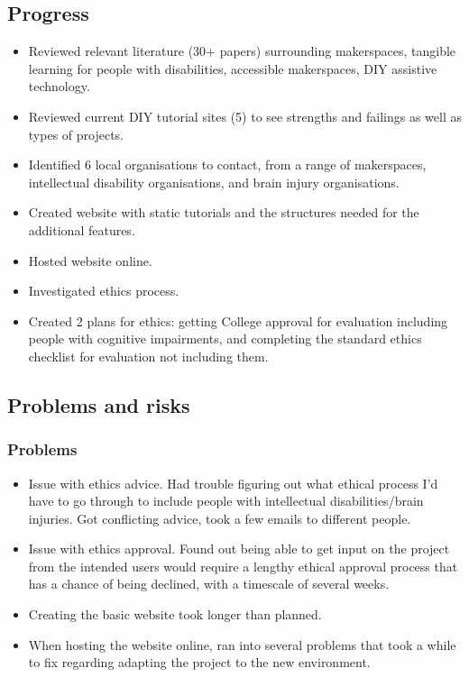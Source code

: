 \documentclass[11pt]{article}
\begin{document}
\subsection{Progress}\label{progress}

\begin{itemize}
    \item Reviewed relevant literature (30+ papers) surrounding makerspaces, tangible learning for people with disabilities, accessible makerspaces, DIY assistive technology. 
    \item Reviewed current DIY tutorial sites (5) to see strengths and failings as well as types of projects.
    \item Identified 6 local organisations to contact, from a range of makerspaces, intellectual disability organisations, and brain injury organisations. 
    \item Created website with static tutorials and the structures needed for the additional features.
    \item Hosted website online.
    \item Investigated ethics process. 
    \item Created 2 plans for ethics: getting College approval for evaluation including people with cognitive impairments, and completing the standard ethics checklist for evaluation not including them. 
\end{itemize}

\subsection{Problems and risks}\label{problems-and-risks}

\subsubsection{Problems}\label{problems}

\begin{itemize}
    \item Issue with ethics advice. Had trouble figuring out what ethical process I'd have to go through to include people with intellectual disabilities/brain injuries. Got conflicting advice, took a few emails to different people.
    \item Issue with ethics approval. Found out being able to get input on the project from the intended users would require a lengthy ethical approval process that has a chance of being declined, with a timescale of several weeks. 
    \item Creating the basic website took longer than planned.
    \item When hosting the website online, ran into several problems that took a while to fix regarding adapting the project to the new environment.  
\end{itemize}
\end{document}
